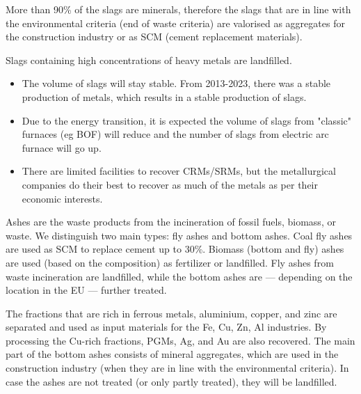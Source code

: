 More than 90\% of the slags are minerals, therefore the slags that are in line with the environmental criteria (end of waste criteria) are valorised as aggregates for the construction industry or as SCM (cement replacement materials). 

Slags containing high concentrations of heavy metals are landfilled. 

\begin{itemize}
  \item The volume of slags will stay stable. From 2013-2023, there was a stable production of metals, which results in a stable production of slags.  
  \item Due to the energy transition, it is expected the volume of slags from "classic" furnaces (eg BOF) will reduce and the number of slags from electric arc furnace will go up.
  \item  There are limited facilities to recover CRMs/SRMs, but the metallurgical companies do their best to recover as much of the metals as per their economic interests.
\end{itemize}


Ashes are the waste products from the incineration of fossil fuels, biomass, or waste. We distinguish two main types: fly ashes and bottom ashes. Coal fly ashes are used as SCM to replace cement up to 30\%. Biomass (bottom and fly) ashes are used (based on the composition) as fertilizer or landfilled. Fly ashes from waste incineration are landfilled, while the bottom ashes are --- depending on the location in the EU --- further treated. 

The fractions that are rich in ferrous metals, aluminium, copper, and zinc are separated and used as input materials for the Fe, Cu, Zn, Al industries. By processing the Cu-rich fractions, PGMs, Ag, and Au are also recovered. The main part of the bottom ashes consists of mineral aggregates, which are used in the construction industry (when they are in line with the environmental criteria). In case the ashes are not treated (or only partly treated), they will be landfilled. 



